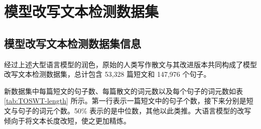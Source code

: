\section{模型改写文本检测数据集}
\label{sec:TOSWT-info}

\subsection{模型改写文本检测数据集信息}

经过上述大型语言模型的润色，原始的人类写作散文与其改进版本共同构成了模型改写文本检测数据集，总计包含 53,328 篇短文和 147,976 个句子。

新数据集中每篇短文的句子数、每篇散文的词元数以及每个句子的词元数如表 \ref{tab:TOSWT-length} 所示。第一行表示一篇短文中的句子个数，接下来分别是短文与句子的词元个数。50\% 表示的是中位数，其他以此类推。大语言模型的改写倾向于将文本长度改短，使之更加精炼。

